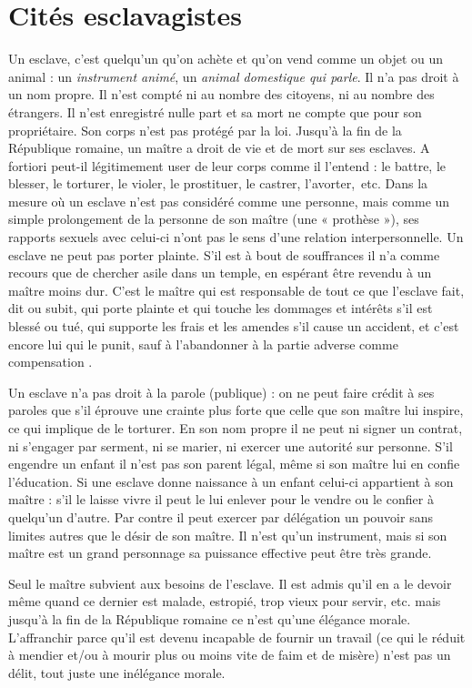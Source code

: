 
\chapter{Cités esclavagistes}

Un esclave, c'est quelqu'un qu'on achète et qu'on vend comme un
objet ou un animal : un {\emph{instrument animé}}, un {\emph{animal
domestique qui parle}}. Il n'a pas droit à un nom propre. Il n'est compté ni au nombre des citoyens,
ni au nombre des étrangers. Il n'est enregistré nulle part et sa
mort ne compte que pour son propriétaire. Son corps n'est pas protégé
par la loi. Jusqu'à la fin de la République romaine, un maître a droit de vie
et de mort sur ses esclaves. A fortiori peut-il légitimement user de leur
corps comme il l'entend : le battre, le blesser, le torturer, le violer, le
prostituer, le castrer, l'avorter,~etc. Dans la mesure où un esclave n'est
pas considéré comme une personne, mais comme un simple prolongement
de la personne de son maître (une « prothèse »), ses rapports
sexuels avec celui-ci n'ont pas le sens d'une relation interpersonnelle.
Un esclave ne peut pas porter plainte. S'il est à bout de souffrances
il n'a comme recours que de chercher asile dans un temple, en espérant
être revendu à un maître moins dur. C'est le maître qui est responsable
de tout ce que l'esclave fait, dit ou subit, qui porte plainte et qui
touche les dommages et intérêts s'il est blessé ou tué, qui supporte les
frais et les amendes s'il cause un accident, et c'est encore lui qui le punit,
sauf à l'abandonner à la partie adverse comme compensation .

Un esclave n'a pas droit à la parole (publique) : on ne peut faire
crédit à ses paroles que s'il éprouve une crainte plus forte que celle que
son maître lui inspire, ce qui implique de le torturer. En son nom propre
il ne peut ni signer un contrat, ni s'engager par serment, ni se marier, ni
exercer une autorité sur personne. S'il engendre un enfant il n'est pas son
parent légal, même si son maître lui en confie l'éducation. Si une esclave
donne naissance à un enfant celui-ci appartient à son maître : s'il le laisse
vivre il peut le lui enlever pour le vendre ou le confier à quelqu'un d'autre.
Par contre il peut exercer par délégation un pouvoir sans limites autres
que le désir de son maître. Il n'est qu'un instrument, mais si son maître
est un grand personnage sa puissance effective peut être très grande.

Seul le maître subvient aux besoins de l'esclave. Il est admis qu'il
en a le devoir même quand ce dernier est malade, estropié, trop vieux
pour servir, etc. mais jusqu'à la fin de la République romaine ce n'est
qu'une élégance morale. L'affranchir parce qu'il est devenu incapable de
fournir un travail (ce qui le réduit à mendier et/ou à mourir plus ou
moins vite de faim et de misère) n'est pas un délit, tout juste une inélégance
morale.

